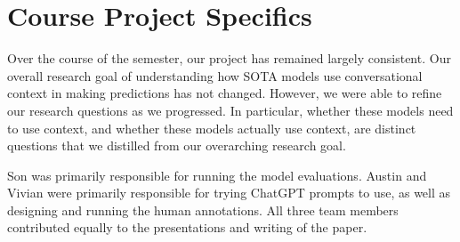 \section{Course Project Specifics}


Over the course of the semester, our project has remained largely consistent.
Our overall research goal of understanding how SOTA models use conversational context in making predictions has not changed.
However, we were able to refine our research questions as we progressed.
In particular, whether these models need to use context, and whether these models actually use context, are distinct questions that we distilled from our overarching research goal.

Son was primarily responsible for running the model evaluations. 
Austin and Vivian were primarily responsible for trying ChatGPT prompts to use, as well as designing and running the human annotations.
All three team members contributed equally to the presentations and writing of the paper.

